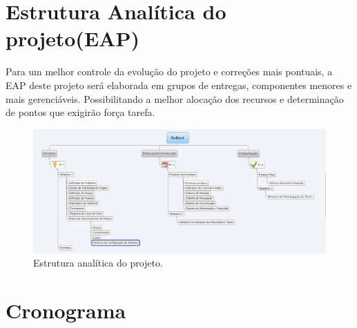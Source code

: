 \section{Estrutura Analítica do projeto(EAP)}

Para um melhor controle da evolução do projeto e correções mais pontuais, a EAP deste projeto será elaborada em grupos de entregas, componentes menores e mais gerenciáveis. Possibilitando a melhor alocação dos recursos e determinação de pontos que exigirão força tarefa.

 \begin{figure} [!htp]
	\centering
	\includegraphics[scale=0.5]{figuras/EAPPI}
	\caption{Estrutura analítica do projeto.}
	\label{EAP}
\end{figure}


\section{Cronograma}

